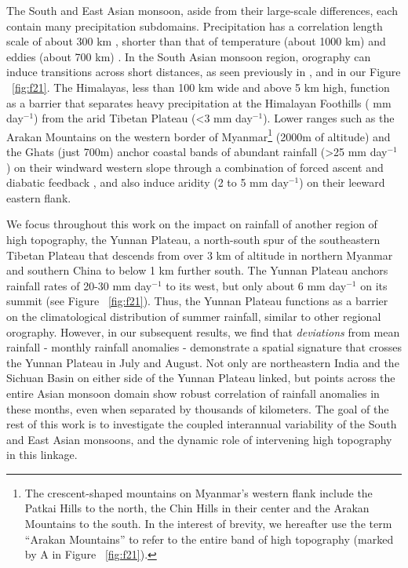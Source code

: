 	The South and East Asian monsoon, aside from their large-scale differences, each contain many precipitation subdomains. Precipitation has a correlation length scale of about 300 km \citep{Dai1997}, shorter than that of temperature (about 1000 km) and eddies (about 700 km) \citep{Hansen1987,Barnes2012}. In the South Asian monsoon region, orography can induce transitions across short distances, as seen previously in \cite{Xie2006}, \cite{Biasutti2011} and in our Figure ~\ref{fig:f21}. The Himalayas, less than 100 km wide and above 5 km high, function as a barrier that separates heavy precipitation at the Himalayan Foothills ( mm day$^{-1}$) from the arid Tibetan Plateau (\textless 3 mm day$^{-1}$). Lower ranges such as the Arakan Mountains on the western border of Myanmar\footnote{The crescent-shaped mountains on Myanmar's western flank include the Patkai Hills to the north, the Chin Hills in their center and the Arakan Mountains to the south. In the interest of brevity, we hereafter use the term ``Arakan Mountains'' to refer to the entire band of high topography (marked by A in Figure ~\ref{fig:f21}).} (\mytilde2000m of altitude) and the Ghats (just \mytilde700m) anchor coastal bands of abundant rainfall (\textgreater25 mm day$^{-1}$) on their windward western slope through a combination of forced ascent and diabatic feedback \citep{Xie2006}, and also induce aridity (2 to 5 mm day$^{-1}$) on their leeward eastern flank. 
	
	We focus throughout this work on the impact on rainfall of another region of high topography, the Yunnan Plateau, a north-south spur of the southeastern Tibetan Plateau that descends from over 3 km of altitude in northern Myanmar and southern China to below 1 km further south. The Yunnan Plateau anchors rainfall rates of 20-30 mm day$^{-1}$ to its west, but only about 6 mm day$^{-1}$ on its summit (see Figure ~\ref{fig:f21}). Thus, the Yunnan Plateau functions as a barrier on the climatological distribution of summer rainfall, similar to other regional orography. However, in our subsequent results, we find that \textit{deviations} from mean rainfall - monthly rainfall anomalies - demonstrate a spatial signature that crosses the Yunnan Plateau in July and August. Not only are northeastern India and the Sichuan Basin on either side of the Yunnan Plateau linked, but points across the entire Asian monsoon domain show robust correlation of rainfall anomalies in these months, even when separated by thousands of kilometers. The goal of the rest of this work is to investigate the coupled interannual variability of the South and East Asian monsoons, and the dynamic role of intervening high topography in this linkage. 
	
